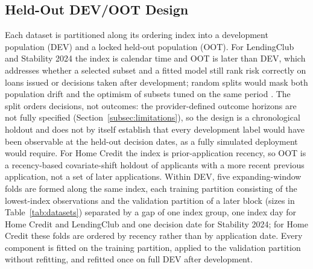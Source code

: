 \documentclass[final,5p,twocolumn]{elsarticle}
\begin{document}
\subsection{Held-Out DEV/OOT Design}
\label{subsec:dev_oot}

Each dataset is partitioned along its ordering index into a development population (DEV) and a locked held-out population (OOT). For LendingClub and Stability 2024 the index is calendar time and OOT is later than DEV, which addresses whether a selected subset and a fitted model still rank risk correctly on loans issued or decisions taken after development; random splits would mask both population drift and the optimism of subsets tuned on the same period \cite{bergmeir2012,gama2014}. The split orders decisions, not outcomes: the provider-defined outcome horizons are not fully specified (Section~\ref{subsec:limitations}), so the design is a chronological holdout and does not by itself establish that every development label would have been observable at the held-out decision dates, as a fully simulated deployment would require. For Home Credit the index is prior-application recency, so OOT is a recency-based covariate-shift holdout of applicants with a more recent previous application, not a set of later applications. Within DEV, five expanding-window folds are formed along the same index, each training partition consisting of the lowest-index observations and the validation partition of a later block (sizes in Table~\ref{tab:datasets}) separated by a gap of one index group, one index day for Home Credit and LendingClub and one decision date for Stability 2024; for Home Credit these folds are ordered by recency rather than by application date. Every component is fitted on the training partition, applied to the validation partition without refitting, and refitted once on full DEV after development.
\end{document}
